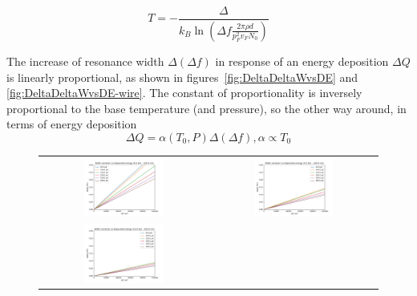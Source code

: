 \documentclass[a4paper,12pt]{article}
\begin{document}
\begin{equation}
T = - \frac{\Delta}{k_B \ln \left( \Delta f \frac{2 \pi \rho d}{p_F^2 v_F N_0} \right)}
\end{equation}

The increase of resonance width $\Delta (\Delta f)$ in response of an energy deposition $\Delta Q$ is linearly proportional, as shown in figures~\ref{fig:DeltaDeltaWvsDE} and \ref{fig:DeltaDeltaWvsDE-wire}.
The constant of proportionality is inversely proportional to the base temperature (and pressure), so the other way around, in terms of energy deposition
\begin{equation}
  \Delta Q = \alpha(T_0,P) \Delta (\Delta f), \alpha \propto T_0
    \label{eq:alpha}
\end{equation}

\begin{figure}[!ht]
  \begin{center}
  \begin{tabular}{cc}
    \includegraphics[width=0.49\textwidth]{DeltaDeltaW_vs_DE-0bar}  &
    \includegraphics[width=0.49\textwidth]{DeltaDeltaW_vs_DE-5bar}  \\
    \includegraphics[width=0.49\textwidth]{DeltaDeltaW_vs_DE-10bar} &

\end{tabular}
\end{center}
\end{figure}
\end{document}
